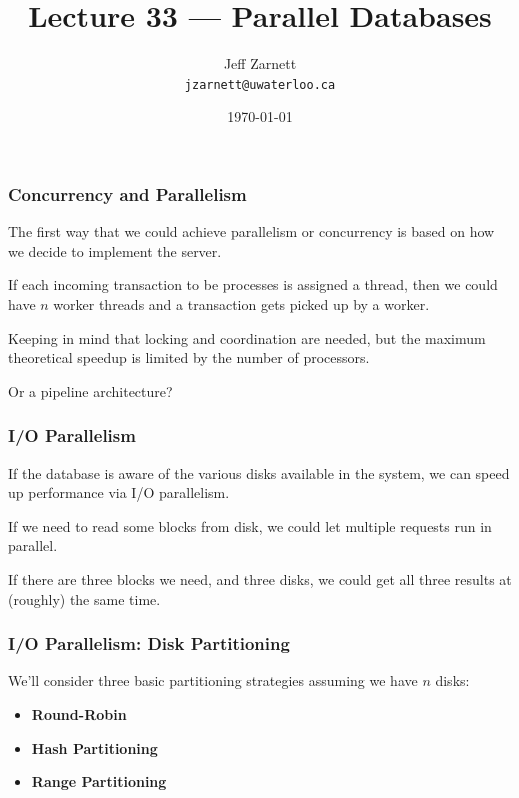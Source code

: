 

\title{Lecture 33 --- Parallel Databases }

\author{Jeff Zarnett \\ \small \texttt{jzarnett@uwaterloo.ca}}
\date{\today}




\begin{frame}
  \titlepage

 \end{frame}
 
 

\begin{frame}
\frametitle{Concurrency and Parallelism}

The first way that we could achieve parallelism or concurrency is based on how we decide to implement the server. 

If each incoming transaction to be processes is assigned a thread, then we could have $n$ worker threads and a transaction gets picked up by a worker. 

Keeping in mind that locking and coordination are needed, but the maximum theoretical speedup is limited by the number of processors.

Or a pipeline architecture?

\end{frame}

\begin{frame}
\frametitle{I/O Parallelism}

If the database is aware of the various disks available in the system, we can speed up performance via I/O parallelism. 

If we need to read some blocks from disk, we could let multiple requests run in parallel. 

If there are three blocks we need, and three disks, we could get all three results at (roughly) the same time. 

\end{frame}


\begin{frame}
\frametitle{I/O Parallelism: Disk Partitioning}

We'll consider three basic partitioning strategies assuming we have $n$ disks:
\begin{itemize}
	\item \textbf{Round-Robin}
	\item \textbf{Hash Partitioning}
	\item \textbf{Range Partitioning}
\end{itemize}

\end{frame}



